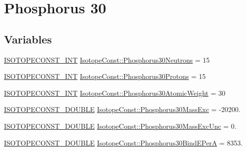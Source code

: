 \hypertarget{group___isotope_const-_phosphorus-_p30}{}\section{Phosphorus 30}
\label{group___isotope_const-_phosphorus-_p30}
\subsection*{Variables}
\begin{DoxyCompactItemize}
\item 
\mbox{\hyperlink{group___isotope_const-_macros_ga5f18360b3e99483a35c32d789e62621c}{I\+S\+O\+T\+O\+P\+E\+C\+O\+N\+S\+T\+\_\+\+I\+NT}} \mbox{\hyperlink{group___isotope_const-_phosphorus-_p30_ga4a39b7058ca5f3bd01a4b2bb37f19c22}{Isotope\+Const\+::\+Phosphorus30\+Neutrons}} = 15
\item 
\mbox{\hyperlink{group___isotope_const-_macros_ga5f18360b3e99483a35c32d789e62621c}{I\+S\+O\+T\+O\+P\+E\+C\+O\+N\+S\+T\+\_\+\+I\+NT}} \mbox{\hyperlink{group___isotope_const-_phosphorus-_p30_ga5e484ab61048ec907367d1d347bb8b08}{Isotope\+Const\+::\+Phosphorus30\+Protons}} = 15
\item 
\mbox{\hyperlink{group___isotope_const-_macros_ga5f18360b3e99483a35c32d789e62621c}{I\+S\+O\+T\+O\+P\+E\+C\+O\+N\+S\+T\+\_\+\+I\+NT}} \mbox{\hyperlink{group___isotope_const-_phosphorus-_p30_ga9409388fd45e99c882b91f9226a5d87a}{Isotope\+Const\+::\+Phosphorus30\+Atomic\+Weight}} = 30
\item 
\mbox{\hyperlink{group___isotope_const-_macros_ga8f45a7272ce02c0b4c65c44636ed719a}{I\+S\+O\+T\+O\+P\+E\+C\+O\+N\+S\+T\+\_\+\+D\+O\+U\+B\+LE}} \mbox{\hyperlink{group___isotope_const-_phosphorus-_p30_gab1250cfdc19dc2515e206179125e9126}{Isotope\+Const\+::\+Phosphorus30\+Mass\+Exc}} = -\/20200.
\item 
\mbox{\hyperlink{group___isotope_const-_macros_ga8f45a7272ce02c0b4c65c44636ed719a}{I\+S\+O\+T\+O\+P\+E\+C\+O\+N\+S\+T\+\_\+\+D\+O\+U\+B\+LE}} \mbox{\hyperlink{group___isotope_const-_phosphorus-_p30_ga34d592352ef18edc4dd5711e18796ee3}{Isotope\+Const\+::\+Phosphorus30\+Mass\+Exc\+Unc}} = 0.
\item 
\mbox{\hyperlink{group___isotope_const-_macros_ga8f45a7272ce02c0b4c65c44636ed719a}{I\+S\+O\+T\+O\+P\+E\+C\+O\+N\+S\+T\+\_\+\+D\+O\+U\+B\+LE}} \mbox{\hyperlink{group___isotope_const-_phosphorus-_p30_gad9b1c801cd0add9cb861c56b9068b51c}{Isotope\+Const\+::\+Phosphorus30\+Bind\+E\+PerA}} = 8353.
\item 

\end{DoxyCompactItemize}
